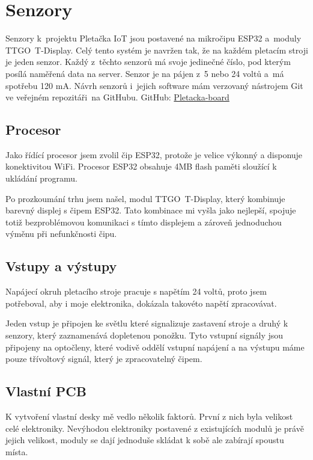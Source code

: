 \chapter{Senzory}

Senzory k~projektu Pletačka IoT jsou postavené na mikročipu ESP32 a~moduly TTGO~T-Display.
Celý tento systém je navržen tak, že na každém pletacím stroji je jeden senzor.
Každý z~těchto senzorů má svoje jedinečné číslo, pod kterým posílá naměřená data na server.
Senzor je na pájen z~5 nebo 24 voltů a~má spotřebu 120 mA.
Návrh senzorů i~jejich software mám verzovaný nástrojem Git ve veřejném repozitáři~na GitHubu.\newline
GitHub: \href{https://github.com/Pletacka-IoT/Pletacka-board}{Pletacka-board}\cite{PL_BOARD}

\section{Procesor}
Jako řídící procesor jsem zvolil čip ESP32, protože je velice výkonný a disponuje konektivitou WiFi.
Procesor ESP32 obsahuje 4MB flash paměti sloužící k ukládání programu.

Po prozkoumání trhu jsem našel, modul TTGO~T-Display, který kombinuje barevný displej s čipem ESP32.
Tato kombinace mi vyšla jako nejlepší, spojuje totiž bezproblémovou komunikaci s tímto displejem a zároveň jednoduchou výměnu při nefunkčnosti čipu.


\section{Vstupy a výstupy}
Napájecí okruh pletacího stroje pracuje s napětím 24 voltů, proto jsem potřeboval, aby i moje elektronika, dokázala takovéto napětí zpracovávat.

Jeden vstup je připojen ke světlu které signalizuje zastavení stroje a druhý k senzory, který zaznamenává dopletenou ponožku.
Tyto vstupní signály jsou připojeny na optočleny, které vodivě oddělí vstupní napájení a na výstupu máme pouze třívoltový signál, který je zpracovatelný čipem.



\section{Vlastní PCB}

K vytvoření vlastní desky mě vedlo několik faktorů. První z nich byla velikost celé elektroniky. 
Nevýhodou elektroniky postavené z existujících modulů je právě jejich velikost, moduly se dají jednoduše skládat k sobě ale zabírají spoustu místa. 
 
